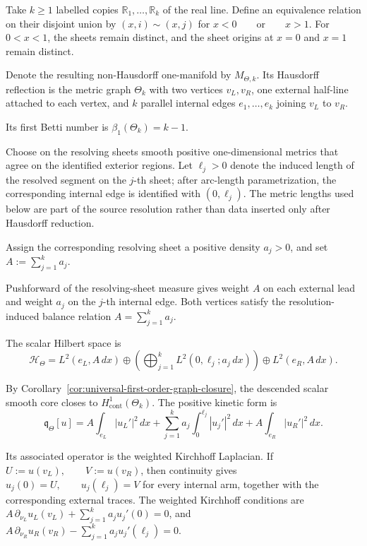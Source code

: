 \documentclass[11pt]{article}
\theoremstyle{plain}
\theoremstyle{definition}
\begin{document}
Take \(k\geq1\) labelled copies \(\mathbb R_1,\ldots,\mathbb R_k\) of the real line. Define an equivalence relation on their disjoint union by \((x,i)\sim(x,j)\) for
\(x<0 \qquad\text{or}\qquad x>1\).
For
\(0<x<1\),
the sheets remain distinct, and the sheet origins at \(x=0\) and \(x=1\)
remain distinct.

Denote the resulting non-Hausdorff one-manifold by
\(M_{\Theta,k}\).
Its Hausdorff reflection is the metric graph \(\Theta_k\) with two vertices \(v_L,v_R\), one external half-line attached to each
vertex, and \(k\) parallel internal edges \(e_1,\ldots,e_k\) joining \(v_L\) to \(v_R\).

Its first Betti number is
\(\beta_1(\Theta_k)=k-1\).

Choose on the resolving sheets smooth positive one-dimensional metrics that
agree on the identified exterior regions. Let \(\ell_j>0\) denote the induced length of the resolved segment on the \(j\)-th sheet;
after arc-length parametrization, the corresponding internal edge is
identified with \((0,\ell_j)\). The metric lengths used below are part
of the source resolution rather than data inserted only after Hausdorff
reduction.

Assign the corresponding resolving sheet a positive density
\(a_j>0\),
and set
\(A:=\sum_{j=1}^{k}a_j\).

Pushforward of the resolving-sheet measure gives weight \(A\) on each
external lead and weight \(a_j\) on the \(j\)-th internal edge. Both
vertices satisfy the resolution-induced balance relation
\(A=\sum_{j=1}^{k}a_j\).

The scalar Hilbert space is
\[
  \mathcal H_\Theta
  =
  L^2(e_L,A\,dx)
  \oplus
  \left(
    \bigoplus_{j=1}^{k}
    L^2(0,\ell_j;a_j\,dx)
  \right)
  \oplus
  L^2(e_R,A\,dx).
\]

By Corollary~\ref{cor:universal-first-order-graph-closure}, the descended scalar
smooth core closes to
\(H^1_{\mathrm{cont}}(\Theta_k)\).
The positive kinetic form is
\[
  \mathfrak q_\Theta[u]
  =
  A\int_{e_L}|u_L'|^2\,dx
  +
  \sum_{j=1}^{k}
  a_j\int_0^{\ell_j}|u_j'|^2\,dx
  +
  A\int_{e_R}|u_R'|^2\,dx.
\]

Its associated operator is the weighted Kirchhoff Laplacian. If
\(U:=u(v_L), \qquad V:=u(v_R)\),
then continuity gives \(u_j(0)=U, \qquad u_j(\ell_j)=V\) for every internal arm, together with the corresponding external traces.
The weighted Kirchhoff conditions are
\(A\,\partial_{\nu_L}u_L(v_L) + \sum_{j=1}^{k}a_ju_j'(0) = 0\),
and
\(A\,\partial_{\nu_R}u_R(v_R) - \sum_{j=1}^{k}a_ju_j'(\ell_j) = 0\).
\end{document}
